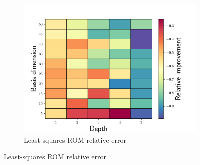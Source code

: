 \documentclass[3p,computermodern,10pt]{elsarticle}
\begin{document}
\begin{figure}
\begin{center}
\begin{subfigure}[t]{0.49\textwidth}
\includegraphics[trim={0cm 0cm 0cm 0cm},clip,width=1.0\linewidth]{code/burgers/synapse_models/basis_study/rel_improvement.pdf}
\caption{Least-squares ROM relative error}
\end{subfigure}
\label{fig:burg_training_results}
\end{center}
\end{figure}
\end{document}

